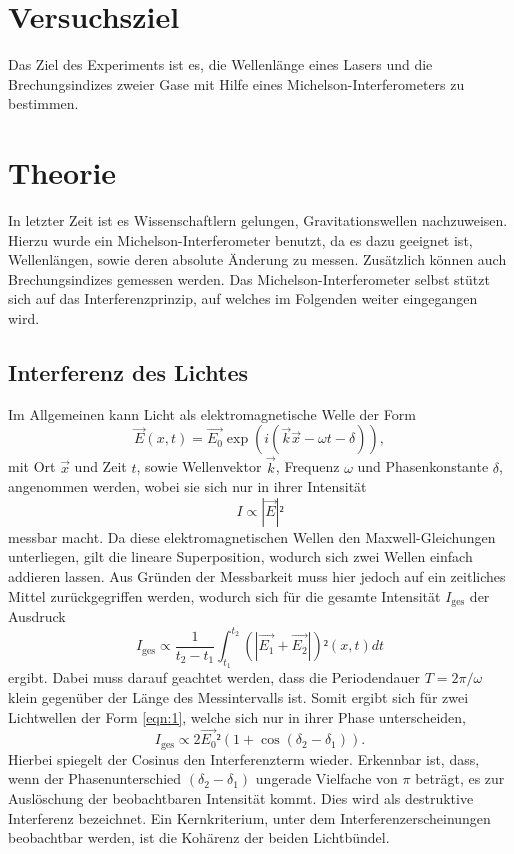 \section{Versuchsziel}
\label{sec:Versuchsziel}
Das Ziel des Experiments ist es, die Wellenlänge eines Lasers und die Brechungsindizes zweier Gase mit Hilfe eines Michelson-Interferometers zu bestimmen.

\section{Theorie}
\label{sec:Theorie}

In letzter Zeit ist es Wissenschaftlern gelungen, Gravitationswellen nachzuweisen.
Hierzu wurde ein Michelson-Interferometer benutzt, da es dazu geeignet ist, Wellenlängen, sowie deren absolute Änderung zu messen.
Zusätzlich können auch Brechungsindizes gemessen werden.
Das Michelson-Interferometer selbst stützt sich auf das Interferenzprinzip, auf welches im Folgenden weiter eingegangen wird.\\
\subsection{Interferenz des Lichtes}
Im Allgemeinen kann Licht als elektromagnetische Welle der Form
\begin{equation}
  \vec{E}(x,t) = \vec{E_0}\exp{(i(\vec{k}\vec{x}-\omega t -\delta))}, \label{eqn:1}
\end{equation}
mit Ort $\vec{x}$ und Zeit $t$, sowie Wellenvektor $\vec{k}$, Frequenz $\omega$ und Phasenkonstante $\delta$, angenommen werden, wobei sie sich nur in ihrer Intensität
\begin{equation}
  I \propto |\vec{E}|²
\end{equation}
messbar macht.
Da diese elektromagnetischen Wellen den Maxwell-Gleichungen unterliegen, gilt die lineare Superposition, wodurch sich zwei Wellen einfach addieren lassen.
Aus Gründen der Messbarkeit muss hier jedoch auf ein zeitliches Mittel zurückgegriffen werden, wodurch sich für die gesamte Intensität $I_{\text{ges}}$ der Ausdruck
\begin{equation}
  I_{\text{ges}} \propto \frac{1}{t_2-t_1} \int_{t_1}^{t_2} (|\vec{E_1}+\vec{E_2}|)²(x,t) dt
\end{equation}
ergibt. Dabei muss darauf geachtet werden, dass die Periodendauer $T = 2\pi/\omega$ klein gegenüber der Länge des Messintervalls ist.
Somit ergibt sich für zwei Lichtwellen der Form \eqref{eqn:1}, welche sich nur in ihrer Phase unterscheiden,
\begin{equation}
  I_{\text{ges}} \propto 2\vec{E_0}²(1+\cos{(\delta_2-\delta_1)}).
\end{equation}
Hierbei spiegelt der Cosinus den Interferenzterm wieder.
Erkennbar ist, dass, wenn der Phasenunterschied $(\delta_2-\delta_1)$ ungerade Vielfache von $\pi$ beträgt, es zur Auslöschung der beobachtbaren Intensität kommt.
Dies wird als destruktive Interferenz bezeichnet.
Ein Kernkriterium, unter dem Interferenzerscheinungen beobachtbar werden, ist die Kohärenz der beiden Lichtbündel.\\

